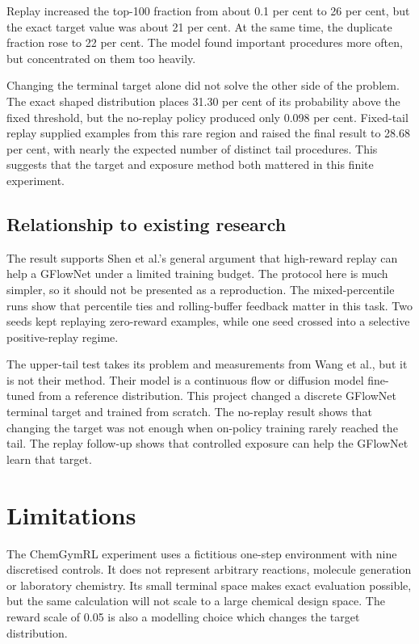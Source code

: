 \documentclass{article}
\begin{document}
Replay increased the top-100 fraction from about 0.1 per cent to 26 per cent, but the exact target value was about 21 per cent. At the same time, the duplicate fraction rose to 22 per cent. The model found important procedures more often, but concentrated on them too heavily.

Changing the terminal target alone did not solve the other side of the problem. The exact shaped distribution places 31.30 per cent of its probability above the fixed threshold, but the no-replay policy produced only 0.098 per cent. Fixed-tail replay supplied examples from this rare region and raised the final result to 28.68 per cent, with nearly the expected number of distinct tail procedures. This suggests that the target and exposure method both mattered in this finite experiment.

\subsection{Relationship to existing research}

The result supports Shen et al.'s general argument that high-reward replay can help a GFlowNet under a limited training budget. The protocol here is much simpler, so it should not be presented as a reproduction. The mixed-percentile runs show that percentile ties and rolling-buffer feedback matter in this task. Two seeds kept replaying zero-reward examples, while one seed crossed into a selective positive-replay regime.

The upper-tail test takes its problem and measurements from Wang et al., but it is not their method. Their model is a continuous flow or diffusion model fine-tuned from a reference distribution. This project changed a discrete GFlowNet terminal target and trained from scratch. The no-replay result shows that changing the target was not enough when on-policy training rarely reached the tail. The replay follow-up shows that controlled exposure can help the GFlowNet learn that target.

\section{Limitations}

The ChemGymRL experiment uses a fictitious one-step environment with nine discretised controls. It does not represent arbitrary reactions, molecule generation or laboratory chemistry. Its small terminal space makes exact evaluation possible, but the same calculation will not scale to a large chemical design space. The reward scale of 0.05 is also a modelling choice which changes the target distribution.
\end{document}

